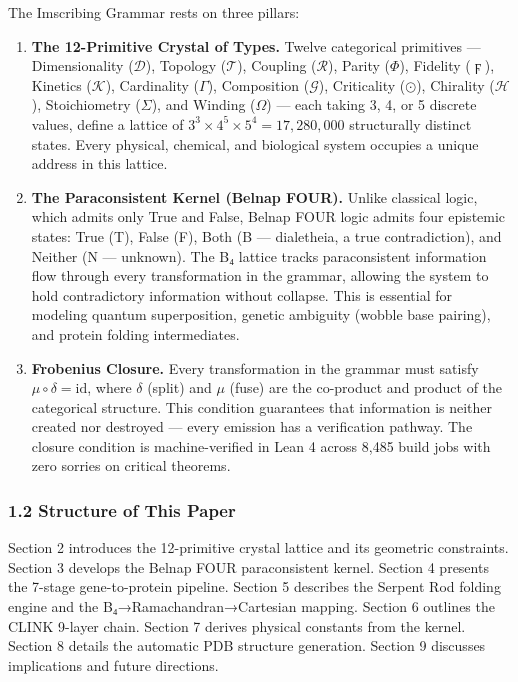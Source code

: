 The Imscribing Grammar rests on three pillars:

\begin{enumerate}
\def\labelenumi{\arabic{enumi}.}
\item
  \textbf{The 12-Primitive Crystal of Types.} Twelve categorical
  primitives --- Dimensionality (\(\mathcal{D}\)), Topology
  (\(\mathcal{T}\)), Coupling (\(\mathcal{R}\)), Parity (\(\Phi\)),
  Fidelity (\(\digamma\)), Kinetics (\(\mathcal{K}\)), Cardinality
  (\(\Gamma\)), Composition (\(\mathcal{G}\)), Criticality (\(\odot\)),
  Chirality (\(\mathcal{H}\)), Stoichiometry (\(\Sigma\)), and Winding
  (\(\Omega\)) --- each taking 3, 4, or 5 discrete values, define a
  lattice of \(3^3 \times 4^5 \times 5^4 = 17,280,000\) structurally
  distinct states. Every physical, chemical, and biological system
  occupies a unique address in this lattice.
\item
  \textbf{The Paraconsistent Kernel (Belnap FOUR).} Unlike classical
  logic, which admits only True and False, Belnap FOUR logic admits four
  epistemic states: True (T), False (F), Both (B --- dialetheia, a true
  contradiction), and Neither (N --- unknown). The B₄ lattice tracks
  paraconsistent information flow through every transformation in the
  grammar, allowing the system to hold contradictory information without
  collapse. This is essential for modeling quantum superposition,
  genetic ambiguity (wobble base pairing), and protein folding
  intermediates.
\item
  \textbf{Frobenius Closure.} Every transformation in the grammar must
  satisfy \(\mu \circ \delta = \text{id}\), where \(\delta\) (split) and
  \(\mu\) (fuse) are the co-product and product of the categorical
  structure. This condition guarantees that information is neither
  created nor destroyed --- every emission has a verification pathway.
  The closure condition is machine-verified in Lean 4 across 8,485 build
  jobs with zero sorries on critical theorems.
\end{enumerate}

\hypertarget{structure-of-this-paper}{%
\subsubsection{1.2 Structure of This
Paper}\label{structure-of-this-paper}}

Section 2 introduces the 12-primitive crystal lattice and its geometric
constraints. Section 3 develops the Belnap FOUR paraconsistent kernel.
Section 4 presents the 7-stage gene-to-protein pipeline. Section 5
describes the Serpent Rod folding engine and the
B₄→Ramachandran→Cartesian mapping. Section 6 outlines the CLINK 9-layer
chain. Section 7 derives physical constants from the kernel. Section 8
details the automatic PDB structure generation. Section 9 discusses
implications and future directions.

